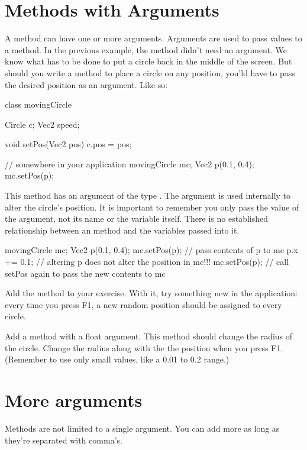 \section{Methods with Arguments}
A method can have one or more arguments. Arguments are used to pass values to a method. In the previous example, the  method didn't need an argument. We know what has to be done to put a circle back in the middle of the screen. But should you write a method to place a circle on any position, you'ld have to pass the desired position as an argument. Like so:

\begin{code}
class movingCircle {
  Circle c;
  Vec2 speed;
  
  void setPos(Vec2 pos) {
    c.pos = pos;
  }
}

// somewhere in your application
movingCircle mc;
Vec2 p(0.1, 0.4);
mc.setPos(p);
\end{code}

This method has an argument of the type . The argument is used internally to alter the circle's position. It is important to remember you only pass the value of the argument, not its name or the variable itself. There is no established relationship between an method and the variables passed into it. 

\begin{code}
movingCircle mc;
Vec2 p(0.1, 0.4);
mc.setPos(p);     // pass contents of p to mc
p.x += 0.1;       // altering p does not alter the position in mc!!!
mc.setPos(p);     // call setPos again to pass the new contents to mc
\end{code}

\begin{exercise}
Add the method  to your exercise. With it, try something new in the application: every time you press F1, a new random position should be assigned to every circle.

Add a method  with a float argument. This method should change the radius of the circle. Change the radius along with the the position when you press F1. (Remember to use only small values, like a 0.01 to 0.2 range.)
\end{exercise}

\section{More arguments}
Methods are not limited to a single argument. You can add more as long as they're separated with comma's.

